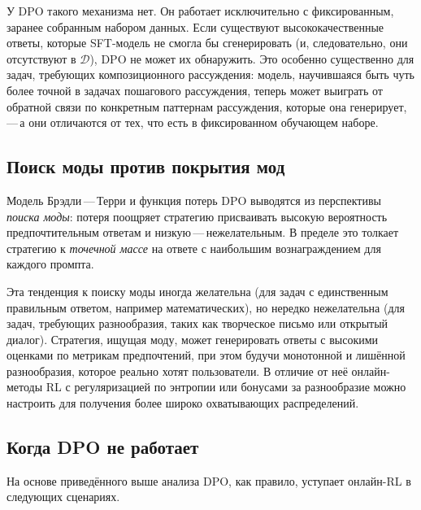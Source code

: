 У DPO такого механизма нет. Он работает исключительно с фиксированным, заранее собранным набором данных. Если существуют высококачественные ответы, которые SFT-модель не смогла бы сгенерировать (и, следовательно, они отсутствуют в $\mathcal{D}$), DPO не может их обнаружить. Это особенно существенно для задач, требующих композиционного рассуждения: модель, научившаяся быть чуть более точной в задачах пошагового рассуждения, теперь может выиграть от обратной связи по конкретным паттернам рассуждения, которые она генерирует,\,---\,а они отличаются от тех, что есть в фиксированном обучающем наборе.

\subsection{Поиск моды против покрытия мод}

Модель Брэдли\,---\,Терри и функция потерь DPO выводятся из перспективы \emph{поиска моды}: потеря поощряет стратегию присваивать высокую вероятность предпочтительным ответам и низкую\,---\,нежелательным. В пределе это толкает стратегию к \emph{точечной массе} на ответе с наибольшим вознаграждением для каждого промпта.

Эта тенденция к поиску моды иногда желательна (для задач с единственным правильным ответом, например математических), но нередко нежелательна (для задач, требующих разнообразия, таких как творческое письмо или открытый диалог). Стратегия, ищущая моду, может генерировать ответы с высокими оценками по метрикам предпочтений, при этом будучи монотонной и лишённой разнообразия, которое реально хотят пользователи. В отличие от неё онлайн-методы RL с регуляризацией по энтропии или бонусами за разнообразие можно настроить для получения более широко охватывающих распределений.

\subsection{Когда DPO не работает}

На основе приведённого выше анализа DPO, как правило, уступает онлайн-RL в следующих сценариях.

